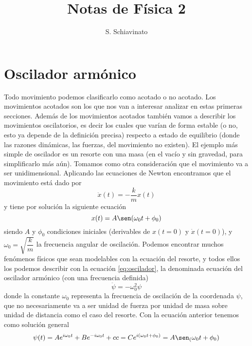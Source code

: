\documentclass[a4paper]{article}
\title{Notas de Física 2}
\author{S. Schiavinato}
\numberwithin{equation}{section}
\begin{document}
\maketitle
\tableofcontents
\section{Oscilador armónico}
    Todo movimiento podemos clasificarlo como acotado o no acotado. Los movimientos acotados son los que nos van a interesar analizar en estas primeras secciones. Además de los movimientos acotados también vamos a describir los movimientos oscilatorios, es decir los cuales que varían de forma estable (o no, esto ya depende de la definición precisa) respecto a estado de equilibrio (donde las razones dinámicas, las fuerzas, del movimiento no existen). 
    El ejemplo más simple de oscilador es un resorte con una masa (en el vacío y sin gravedad, para simplificarlo más aún). Tomamos como otra consideración que el movimiento va a ser unidimensional. Aplicando las ecuaciones de Newton encontramos que el movimiento está dado por
    \begin{equation*}
        \ddot{x}(t) = - \frac{k}{m} x(t)
    \end{equation*}
    y tiene por solución la siguiente ecuación
    \begin{equation*}
        x(t) = A \sen(\omega_0 t + \phi_0)
    \end{equation*}
    siendo $A$ y $\phi_0$ condiciones iniciales (derivables de $x(t = 0)$ y $\dot{x}(t = 0)$), y $\omega_0 = \sqrt{\dfrac{k}{m}}$ la frecuencia angular de oscilación. 
    Podemos encontrar muchos fenómenos físicos que sean modelables con la ecuación del resorte, y todos ellos los podemos describir con la ecuación \ref{eq:oscilador}, la denominada ecuación del oscilador armónico (con una frecuencia definida)
    \begin{equation}
        \ddot{\psi} = -\omega_0^2 \psi
        \label{eq:oscilador}
    \end{equation}
    donde la constante $\omega_0$ representa la frecuencia de oscilación de la coordenada $\psi$, que no necesariamente va a ser unidad de fuerza por unidad de masa sobre unidad de distancia como el caso del resorte. Con la ecuación anterior tenemos como solución general
    \begin{equation}
        \psi(t) = A e^{i \omega_0 t} + B e^{-i \omega_0 t} + cc = C e^{i (\omega_0 t + \phi_0)} = A \sen_(\omega_0 t + \phi_0)
        \label{eq:oscilador_solucion}
    \end{equation}
\end{document}

